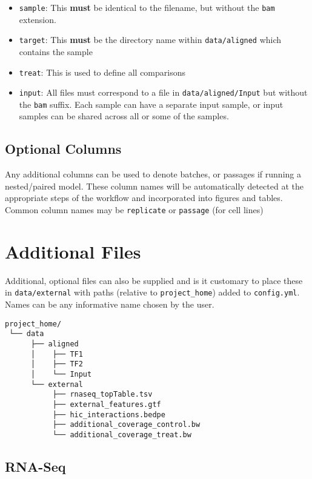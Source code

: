 \documentclass[
]{book}
\providecommand{\tightlist}{%
  \setlength{\itemsep}{0pt}\setlength{\parskip}{0pt}}
\begin{document}
\begin{itemize}
\tightlist
\item
  \texttt{sample}: This \textbf{must} be identical to the filename, but without the \texttt{bam} extension.
\item
  \texttt{target}: This \textbf{must} be the directory name within \texttt{data/aligned} which contains the sample
\item
  \texttt{treat}: This is used to define all comparisons
\item
  \texttt{input}: All files must correspond to a file in \texttt{data/aligned/Input} but without the \texttt{bam} suffix. Each sample can have a separate input sample, or input samples can be shared across all or some of the samples.
\end{itemize}

\hypertarget{optional-columns}{%
\subsection{Optional Columns}\label{optional-columns}}

Any additional columns can be used to denote batches, or passages if running a nested/paired model.
These column names will be automatically detected at the appropriate steps of the workflow and incorporated into figures and tables.
Common column names may be \texttt{replicate} or \texttt{passage} (for cell lines)

\hypertarget{additional-files}{%
\section{Additional Files}\label{additional-files}}

Additional, optional files can also be supplied and is it customary to place these in \texttt{data/external} with paths (relative to \texttt{project\_home}) added to \texttt{config.yml}.
Names can be any informative name chosen by the user.

\begin{verbatim}
project_home/
 └── data
      ├── aligned 
      │    ├── TF1 
      │    ├── TF2 
      │    └── Input
      └── external
           ├── rnaseq_topTable.tsv
           ├── external_features.gtf
           ├── hic_interactions.bedpe
           ├── additional_coverage_control.bw
           └── additional_coverage_treat.bw
\end{verbatim}

\hypertarget{rna-seq}{%
\subsection{RNA-Seq}\label{rna-seq}}
\end{document}
